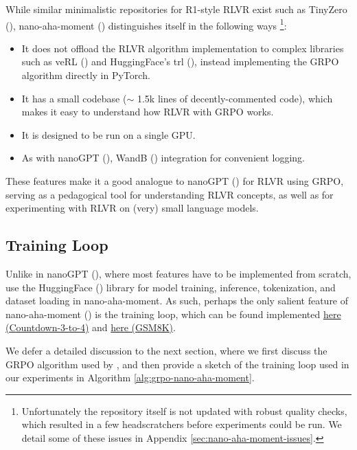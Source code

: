 \documentclass{article} %
\theoremstyle{definition}
\begin{document}
While similar minimalistic repositories for R1-style RLVR exist such as TinyZero (\cite{tinyzero}),
nano-aha-moment (\cite{nano-aha-moment}) distinguishes itself in the following ways \footnote{
    Unfortunately the repository itself is not updated with robust quality checks,
    which resulted in a few headscratchers before experiments could be run.
    We detail some of these issues in Appendix \ref{sec:nano-aha-moment-issues}.
}:
\begin{itemize}
    \item It does not offload the RLVR algorithm implementation to complex libraries such as veRL (\cite{veRL, veRL2})
and HuggingFace's trl (\cite{trl}), instead implementing the GRPO algorithm directly in PyTorch. 
    \item It has a small codebase ($\sim$ 1.5k lines of decently-commented code), which 
        makes it easy to understand how RLVR with GRPO works.
    \item It is designed to be run on a single GPU.
    \item As with nanoGPT (\cite{nanoGPT}), WandB (\cite{wandb}) integration for convenient logging.
\end{itemize} 

These features make it a good analogue to nanoGPT (\cite{nanoGPT}) for RLVR using GRPO,
serving as a pedagogical tool for understanding RLVR concepts, 
as well as for experimenting with RLVR on (very) small language models.

\subsection{Training Loop}

Unlike in nanoGPT (\cite{nanoGPT}), where most features have to be implemented from scratch,
\cite{nano-aha-moment} use the HuggingFace (\cite{HuggingFace}) library
for model training, inference, tokenization, and dataset loading in nano-aha-moment.
As such, perhaps the only salient feature of nano-aha-moment (\cite{nano-aha-moment})
is the training loop, which can be found implemented \href{../../code/nano-aha-moment/nano_r1_script.py}{here (Countdown-3-to-4)} and 
\href{../../code/nano-aha-moment/nano_r1_gsm8k.py}{here (GSM8K)}.

We defer a detailed discussion to the next section, where we first discuss the GRPO algorithm
used by \cite{nano-aha-moment}, and then provide a sketch of the training loop
used in our experiments in Algorithm \ref{alg:grpo-nano-aha-moment}.
\end{document}
